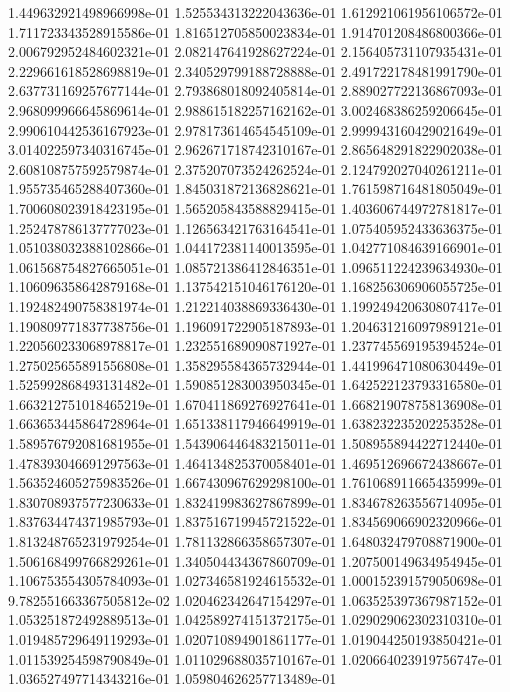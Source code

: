 1.449632921498966998e-01
1.525534313222043636e-01
1.612921061956106572e-01
1.711723343528915586e-01
1.816512705850023834e-01
1.914701208486800366e-01
2.006792952484602321e-01
2.082147641928627224e-01
2.156405731107935431e-01
2.229661618528698819e-01
2.340529799188728888e-01
2.491722178481991790e-01
2.637731169257677144e-01
2.793868018092405814e-01
2.889027722136867093e-01
2.968099966645869614e-01
2.988615182257162162e-01
3.002468386259206645e-01
2.990610442536167923e-01
2.978173614654545109e-01
2.999943160429021649e-01
3.014022597340316745e-01
2.962671718742310167e-01
2.865648291822902038e-01
2.608108757592579874e-01
2.375207073524262524e-01
2.124792027040261211e-01
1.955735465288407360e-01
1.845031872136828621e-01
1.761598716481805049e-01
1.700608023918423195e-01
1.565205843588829415e-01
1.403606744972781817e-01
1.252478786137777023e-01
1.126563421763164541e-01
1.075405952433636375e-01
1.051038032388102866e-01
1.044172381140013595e-01
1.042771084639166901e-01
1.061568754827665051e-01
1.085721386412846351e-01
1.096511224239634930e-01
1.106096358642879168e-01
1.137542151046176120e-01
1.168256306906055725e-01
1.192482490758381974e-01
1.212214038869336430e-01
1.199249420630807417e-01
1.190809771837738756e-01
1.196091722905187893e-01
1.204631216097989121e-01
1.220560233068978817e-01
1.232551689090871927e-01
1.237745569195394524e-01
1.275025655891556808e-01
1.358295584365732944e-01
1.441996471080630449e-01
1.525992868493131482e-01
1.590851283003950345e-01
1.642522123793316580e-01
1.663212751018465219e-01
1.670411869276927641e-01
1.668219078758136908e-01
1.663653445864728964e-01
1.651338117946649919e-01
1.638232235202253528e-01
1.589576792081681955e-01
1.543906446483215011e-01
1.508955894422712440e-01
1.478393046691297563e-01
1.464134825370058401e-01
1.469512696672438667e-01
1.563524605275983526e-01
1.667430967629298100e-01
1.761068911665435999e-01
1.830708937577230633e-01
1.832419983627867899e-01
1.834678263556714095e-01
1.837634474371985793e-01
1.837516719945721522e-01
1.834569066902320966e-01
1.813248765231979254e-01
1.781132866358657307e-01
1.648032479708871900e-01
1.506168499766829261e-01
1.340504434367860709e-01
1.207500149634954945e-01
1.106753554305784093e-01
1.027346581924615532e-01
1.000152391579050698e-01
9.782551663367505812e-02
1.020462342647154297e-01
1.063525397367987152e-01
1.053251872492889513e-01
1.042589274151372175e-01
1.029029062302310310e-01
1.019485729649119293e-01
1.020710894901861177e-01
1.019044250193850421e-01
1.011539254598790849e-01
1.011029688035710167e-01
1.020664023919756747e-01
1.036527497714343216e-01
1.059804626257713489e-01
